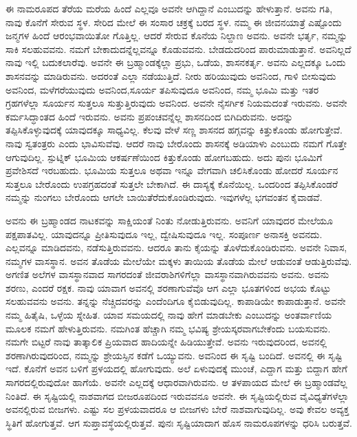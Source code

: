 ಈ ನಾಮರೂಪದ ತೆರೆಯ ಮರೆಯ ಹಿಂದೆ ಎಲ್ಲವೂ ಅವನೇ ಆಗಿದ್ದಾನೆ ಎಂಬುದನ್ನು ಹೇಳುತ್ತಾನೆ. ಅವನು ಗತಿ, ನಾವು ಕೊನೆಗೆ ಸೇರುವ ಸ್ಥಳ. ಸೇರಿದ ಮೇಲೆ ಈ ಸಂಸಾರ ಚಕ್ರಕ್ಕೆ ಬರದ ಸ್ಥಳ. ನಮ್ಮ ಈ ಜೀವನಯಾತ್ರೆ ಎಷ್ಟೊಂದು ಜನ್ಮಗಳ ಹಿಂದೆ ಆರಂಭವಾಯಿತೋ ಗೊತ್ತಿಲ್ಲ. ಆದರೆ ಸೇರುವ ಕೊನೆಯ ನಿಲ್ದಾಣ ಅವನು. ಅವನೇ ಭರ್ತೃ, ನಮ್ಮನ್ನು ಸಾಕಿ ಸಲಹುವವನು. ನಮಗೆ ಬೇಕಾದುದನ್ನೆಲ್ಲವನ್ನೂ ಕೊಡುವವನು. ಬೇಡದುದರಿಂದ ಪಾರುಮಾಡುತ್ತಾನೆ. ಅವನಿಲ್ಲದೆ ನಾವು ಇಲ್ಲಿ ಬದುಕಲಾರೆವು. ಅವನೇ ಈ ಬ್ರಹ್ಮಾಂಡಕ್ಕೆಲ್ಲಾ ಪ್ರಭು, ಒಡೆಯ, ಶಾಸನಕರ್ತೃ. ಅವನು ಎಲ್ಲದಕ್ಕೂ ಒಂದು ಶಾಸನವನ್ನು ಮಾಡಿರುವನು. ಅದರಂತೆ ಎಲ್ಲಾ ನಡೆಯುತ್ತಿದೆ. ನೀರು ಹರಿಯುವುದು ಅವನಿಂದ, ಗಾಳಿ ಬೀಸುವುದು ಅವನಿಂದ, ಮಳೆಗರೆಯುವುದು ಅವನಿಂದ,\break ಸೂರ್ಯ ತಪಿಸುವುದೂ ಅವನಿಂದ, ನಮ್ಮ ಭೂಮಿ ಮತ್ತು ಇತರ ಗ್ರಹಗಳೆಲ್ಲಾ ಸೂರ್ಯನ ಸುತ್ತಲೂ ಸುತ್ತುತ್ತಿರುವುದು ಅವನಿಂದ. ಅವನೇ ನೈಸರ್ಗಿಕ ನಿಯಮದಂತೆ ಇರುವನು. ಅವನೇ ಕರ್ಮಸಿದ್ಧಾಂತದ ಹಿಂದೆ ಇರುವನು. ಅವನು ಪ್ರಪಂಚವನ್ನೆಲ್ಲ ಶಾಸನದಿಂದ ಬಿಗಿದಿರುವನು. ಅದನ್ನು ತಪ್ಪಿಸಿಕೊಳ್ಳುವುದಕ್ಕೆ ಯಾವುದಕ್ಕೂ ಸಾಧ್ಯವಿಲ್ಲ. ಕೆಲವು ವೇಳೆ ಸಣ್ಣ ಶಾಸನದ ಹಗ್ಗವನ್ನು ಕಿತ್ತುಕೊಂಡು ಹೋಗುತ್ತೇವೆ. ನಾವು ಸ್ವತಂತ್ರರು ಎಂದು ಭಾವಿಸುವೆವು. ಆದರೆ ನಾವು ಬೇರೊಂದು ಶಾಸನಕ್ಕೆ ಅಡಿಯಾಳು ಎಂಬುದು ನಮಗೆ ಗೊತ್ತೇ ಆಗುವುದಿಲ್ಲ. ಸ್ಪುಟ್ನಿಕ್ ಭೂಮಿಯ ಆಕರ್ಷಣೆಯಿಂದ ಕಿತ್ತುಕೊಂಡು ಹೋಗಬಹುದು. ಅದು ಪುನಃ ಭೂಮಿಗೆ ಪ್ರವೇಶಿಸದೆ ಇರಬಹುದು. ಭೂಮಿಯ ಸುತ್ತಲೂ ಅಥವಾ ಇನ್ನೂ ವೇಗವಾಗಿ ಚಲಿಸಿಕೊಂಡು ಹೋದರೆ ಸೂರ್ಯನ ಸುತ್ತಲೂ ಬೇರೊಂದು ಉಪಗ್ರಹದಂತೆ ಸುತ್ತಲೇ ಬೇಕಾಗಿದೆ. ಈ ದಾಸ್ಯಕ್ಕೆ ಕೊನೆಯಿಲ್ಲ. ಒಂದರಿಂದ ತಪ್ಪಿಸಿಕೊಂಡರೆ ನಮ್ಮನ್ನು ನುಂಗಲು ಬೇರೊಂದು ಆಗಲೇ ಬಾಯಿತೆರೆದುಕೊಂಡಿರುವುದು. ಇವುಗಳೆಲ್ಲ ಭಗವಂತನ ಕೈವಾಡವೆ.

ಅವನು ಈ ಬ್ರಹ್ಮಾಂಡದ ನಾಟಕವನ್ನು ಸಾಕ್ಷಿಯಂತೆ ನಿಂತು ನೋಡುತ್ತಿರುವನು. ಅವನಿಗೆ ಯಾವುದರ ಮೇಲೆಯೂ ಪಕ್ಷಪಾತವಿಲ್ಲ. ಯಾವುದನ್ನೂ ಪ್ರೀತಿಸುವುದೂ ಇಲ್ಲ, ದ್ವೇಷಿಸುವುದೂ ಇಲ್ಲ. ಸಂಪೂರ್ಣ ಅನಾಸಕ್ತಿ ಅವನದು. ಎಲ್ಲವನ್ನೂ ಮಾಡಿದವನು, ನಡೆಸುತ್ತಿರುವವನು. ಆದರೂ ತಾನು ಕೈಯನ್ನು ತೊಳೆದುಕೊಂಡಿರುವನು. ಅವನೇ ನಿವಾಸ, ನಮ್ಮಗಳ ವಾಸಸ್ಥಾನ. ಅವನ ತೊಡೆಯ ಮೇಲೆಯೇ ಮಕ್ಕಳು ತಾಯಿಯ ತೊಡೆಯ ಮೇಲೆ ಆಡುವಂತೆ ಆಡುತ್ತಿರುವೆವು. ಅಗಣಿತ ಅಲೆಗಳ ವಾಸಸ್ಥಾನವಾದ ಸಾಗರದಂತೆ ಜೀವರಾಶಿಗಳಿಗೆಲ್ಲಾ ವಾಸಸ್ಥಾನವಾಗಿರುವವನು ಅವನು. ಅವನು ಶರಣು, ಎಂದರೆ ರಕ್ಷಕ. ನಾವು ಯಾವಾಗ ಅವನಲ್ಲಿ ಶರಣಾಗುವೆವೊ ಆಗ ಎಲ್ಲಾ ಭೂತಗಳಿಂದ ಅಭಯ ಕೊಟ್ಟು ಸಲಹುವವನು ಅವನು. ತನ್ನನ್ನು ನೆಚ್ಚಿದವರನ್ನು ಎಂದೆಂದಿಗೂ ಕೈಬಿಡುವುದಿಲ್ಲ. ಕಾಪಾಡಿಯೇ ಕಾಪಾಡುತ್ತಾನೆ. ಅವನೇ ನಮ್ಮ ಹಿತೈಷಿ, ಒಳ್ಳೆಯ ಸ್ನೇಹಿತ. ಯಾವ ಸಮಯದಲ್ಲಿ ನಾವು ಹೇಗೆ ಮಾಡಬೇಕು ಎಂಬುದನ್ನು ಅಂತರ್ವಾಣಿಯ ಮೂಲಕ ನಮಗೆ ಹೇಳುತ್ತಿರುವನು. ನಮಗಿಂತ ಹೆಚ್ಚಾಗಿ ನಮ್ಮ ಭವಿಷ್ಯ ಶ್ರೇಯಸ್ಕರವಾಗಬೇಕೆಂದು ಬಯಸುವನು. ನಮಗೇ ಬಿಟ್ಟರೆ ನಾವು ತಾತ್ಕಾಲಿಕ ಪ್ರಿಯವಾದ ಹಾದಿಯನ್ನೇ ಹಿಡಿಯುತ್ತೇವೆ. ಅವನು ಇರುವುದರಿಂದ, ಅವನಲ್ಲಿ ಶರಣಾಗಿರುವುದರಿಂದ, ನಮ್ಮನ್ನು ಶ್ರೇಯಸ್ಸಿನ ಕಡೆಗೆ ಒಯ್ಯುವನು. ಅವನಿಂದ ಈ ಸೃಷ್ಟಿ ಬಂದಿದೆ. ಅವನಲ್ಲಿ ಈ ಸೃಷ್ಟಿ ಇದೆ. ಕೊನೆಗೆ ಅವನ ಬಳಿಗೆ ಪ್ರಳಯದಲ್ಲಿ ಹೋಗುವುದು. ಅಲೆ ಏಳುವುದಕ್ಕೆ ಮುಂಚೆ, ಎದ್ದಾಗ ಮತ್ತು ಬಿದ್ದಾಗ ಹೇಗೆ ಸಾಗರದಲ್ಲಿರುವುದೋ ಹಾಗೆಯೆ. ಅವನೇ ಎಲ್ಲದಕ್ಕೆ ಆಧಾರವಾಗಿರುವನು. ಆ ತಳಪಾಯದ ಮೇಲೆ ಈ ಬ್ರಹ್ಮಾಂಡವೆಲ್ಲ ನಿಂತಿದೆ. ಈ ಸೃಷ್ಟಿಯಲ್ಲಿ ನಾಶವಾಗದ ಬೀಜರೂಪದಿಂದ ಇರುವವನೂ ಅವನೇ. ಈ ಸೃಷ್ಟಿಯಲ್ಲಿರುವ ವೈವಿಧ್ಯತೆಗಳೆಲ್ಲಾ ಅವನಲ್ಲಿರುವ ಬೀಜಗಳು. ಎಷ್ಟು ಸಲ ಪ್ರಳಯವಾದರೂ ಆ ಬೀಜಗಳು ಬೇರೆ ನಾಶವಾಗುವುದಿಲ್ಲ. ಅವು ಕೇವಲ ಅವ್ಯಕ್ತ ಸ್ಥಿತಿಗೆ ಹೋಗುತ್ತವೆ. ಆಗ ಸುಪ್ತಾವಸ್ಥೆಯಲ್ಲಿರುತ್ತವೆ. ಪುನಃ ಸೃಷ್ಟಿಯಾದಾಗ ಹೊಸ ನಾಮರೂಪಗಳನ್ನು ಧರಿಸಿ ಬರುತ್ತವೆ.

